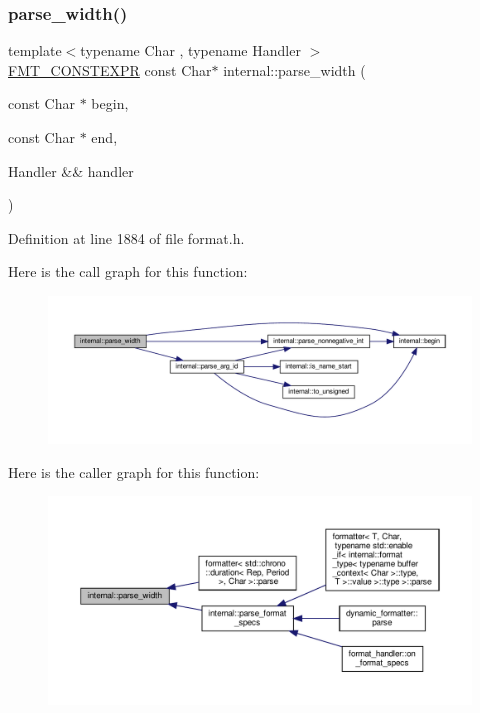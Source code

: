 \subsubsection{\texorpdfstring{parse\+\_\+width()}{parse\_width()}}
{\footnotesize\ttfamily template$<$typename Char , typename Handler $>$ \\
\hyperlink{core_8h_a69201cb276383873487bf68b4ef8b4cd}{F\+M\+T\+\_\+\+C\+O\+N\+S\+T\+E\+X\+PR} const Char$\ast$ internal\+::parse\+\_\+width (\begin{DoxyParamCaption}\item[{const Char $\ast$}]{begin,  }\item[{const Char $\ast$}]{end,  }\item[{Handler \&\&}]{handler }\end{DoxyParamCaption})}



Definition at line 1884 of file format.\+h.

Here is the call graph for this function\+:
\nopagebreak
\begin{figure}[H]
\begin{center}
\leavevmode
\includegraphics[width=350pt]{namespaceinternal_aa5e9c93ad05ebd920505acdd2122ede6_cgraph}
\end{center}
\end{figure}
Here is the caller graph for this function\+:
\nopagebreak
\begin{figure}[H]
\begin{center}
\leavevmode
\includegraphics[width=350pt]{namespaceinternal_aa5e9c93ad05ebd920505acdd2122ede6_icgraph}
\end{center}
\end{figure}
\mbox{\label{namespaceinternal_ad87d0379a03bffd4618909e465a35dfa}} 

